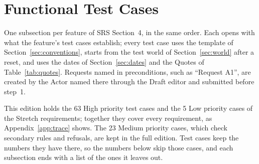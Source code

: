 \section{Functional Test Cases}\label{sec:cases}
One subsection per feature of SRS Section~4, in the same order. Each opens with what the feature's test cases establish; every test case uses the template of Section~\ref{sec:conventions}, starts from the test world of Section~\ref{sec:world} after a reset, and uses the dates of Section~\ref{sec:dates} and the Quotes of Table~\ref{tab:quotes}. Requests named in preconditions, such as ``Request A1'', are created by the Actor named there through the Draft editor and submitted before step~1.

This edition holds the 63 High priority test cases and the 5 Low priority cases of the Stretch requirements; together they cover every requirement, as Appendix~\ref{app:trace} shows. The 23 Medium priority cases, which check secondary rules and refusals, are kept in the full edition. Test cases keep the numbers they have there, so the numbers below skip those cases, and each subsection ends with a list of the ones it leaves out.













